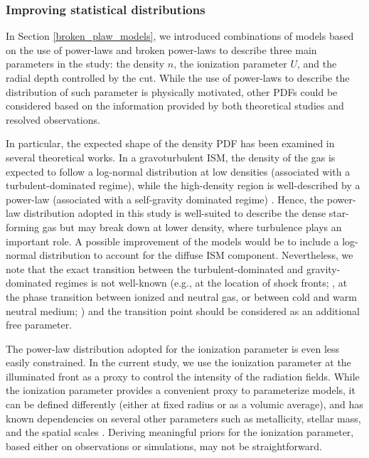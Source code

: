 \documentclass{aa}
\begin{document}
\subsubsection{Improving statistical distributions}
\label{discussion_powerlaw}
In Section \ref{broken_plaw_models}, we introduced combinations of models based on the use of power-laws and broken power-laws to describe three main parameters in the study: the density $n$, the ionization parameter $U$, and the radial depth controlled by the cut. While the use of power-laws to describe the distribution of such parameter is physically motivated, other PDFs could be considered based on the information provided by both theoretical studies and resolved observations.

In particular, the expected shape of the density PDF has been examined in several theoretical works. In a gravoturbulent ISM, the density of the gas is expected to follow a log-normal distribution at low densities (associated with a turbulent-dominated regime), while the high-density region is well-described by a power-law (associated with a self-gravity dominated regime) \citep[e.g.,][]{Offner_2014, Burkhart_2018, Burkhart_2019,Jaupart_Chabrier_2020, Appel_2023}. Hence, the power-law distribution adopted in this study is well-suited to describe the dense star-forming gas but may break down at lower density, where turbulence plays an important role. A possible improvement of the models would be to include a log-normal distribution to account for the diffuse ISM component. Nevertheless, we note that the exact transition between the turbulent-dominated and gravity-dominated regimes is not well-known (e.g., at the location of shock fronts; \citealt{Appel_2023}, at the phase transition between ionized and neutral gas, or between cold and warm neutral medium; \citealt{Kobayashi_2022}) and the transition point should be considered as an additional free parameter. 

The power-law distribution adopted for the ionization parameter is even less easily constrained. In the current study, we use the ionization parameter at the illuminated front as a proxy to control the intensity of the radiation fields. While the ionization parameter provides a convenient proxy to parameterize models, it can be defined differently (either at fixed radius or as a volumic average), and has known dependencies on several other parameters such as metallicity, stellar mass, and the spatial scales \citep[e.g.,][]{Ji_2022}. Deriving meaningful priors for the ionization parameter, based either on observations or simulations, may not be straightforward. 
\end{document}
